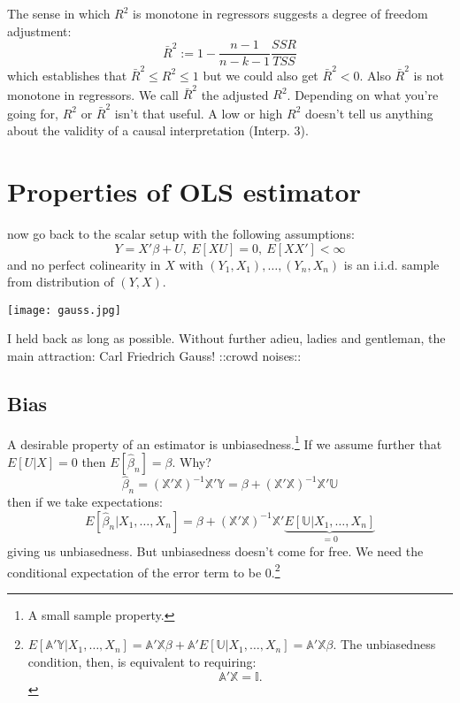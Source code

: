 \documentclass{tufte-book}
\theoremstyle{mytheoremstyle}
\theoremstyle{mylemstyle}
\theoremstyle{mydefstyle}
\begin{document}
The sense in which \(R^2\) is monotone in regressors suggests a degree of freedom adjustment:
	\[\bar{R}^2 := 1 - \frac{n-1}{n-k-1}\frac{SSR}{TSS}\]
which establishes that \(\bar{R}^2 \le R^2 \le 1\) but we could also get \(\bar{R}^2 < 0\). Also \(\bar{R}^2\) is not monotone in regressors. We call \(\bar{R}^2\) the adjusted \(R^2\). Depending on what you're going for, \(R^2\) or \(\bar{R}^2\) isn't that useful. A low or high \(R^2\) doesn't tell us anything about the validity of a causal interpretation (Interp. 3).

\section{Properties of OLS estimator}
 now go back to the scalar setup with the following assumptions:
	\[Y = X'\beta + U,\ E[XU] = 0,\ E[XX'] < \infty\]
and no perfect colinearity in \(X\) with \((Y_1, X_1), \dots, (Y_n, X_n)\) is an i.i.d. sample from distribution of \((Y,X)\). \begin{marginfigure} \texttt{[image: gauss.jpg]} \caption{I held back as long as possible. Without further adieu, ladies and gentleman, the main attraction: Carl Friedrich Gauss! ::crowd noises::} \end{marginfigure}

\subsection{Bias} A desirable property of an estimator is unbiasedness.\footnote{A small sample property.} If we assume further that \(E[U|X] = 0\) then \(E[\hat{\beta}_n] = \beta\). Why? 
	\[\hat{\beta}_n = (\mathbb{X}'\mathbb{X})^{-1}\mathbb{X}'\mathbb{Y} = \beta + (\mathbb{X}'\mathbb{X})^{-1}\mathbb{X}'\mathbb{U}\]
then if we take expectations:
	\[E[\hat{\beta}_n|X_1, \dots, X_n] = \beta + (\mathbb{X}'\mathbb{X})^{-1}\mathbb{X}'\underbrace{E[\mathbb{U}|X_1, \dots, X_n]}_\textrm{\(=0\)}\]
giving us unbiasedness. But unbiasedness doesn't come for free. We need the conditional expectation of the error term to be 0.\footnote{\(E[\mathbb{A}'\mathbb{Y}|X_1, \dots, X_n] = \mathbb{A}'\mathbb{X}\beta + \mathbb{A}'E[\mathbb{U}|X_1, \dots, X_n] = \mathbb{A}'\mathbb{X}\beta\). The unbiasedness condition, then, is equivalent to requiring:
	\[\mathbb{A}'\mathbb{X} = \mathbb{I} \text{.}\]}
\end{document}

